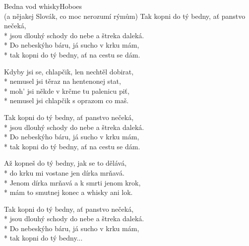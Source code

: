 \documentclass[10.5pt]{book}
\begin{document}
\begin{poem}{Bedna vod whisky}{Hoboes\\(a nějakej Slovák, co moc nerozumí rýmům)}
Tak kopni do tý bedny, ať panstvo nečeká,\\*
jsou dlouhý schody do nebe a štreka daleká.\\*
Do nebeskýho báru, já sucho v krku mám,\\*
tak kopni do tý bedny, ať na cestu se dám.

Kdyby jsi se, chlapčik, len nechtěl dobirat,\\*
nemusel jsi těraz na hentenonej stat,\\*
moh' jsi někde v krčme tu palenicu piť,\\*
nemusel jsi chlapčik s oprazom co maš.

Tak kopni do tý bedny, ať panstvo nečeká,\\*
jsou dlouhý schody do nebe a štreka daleká.\\*
Do nebeskýho báru, já sucho v krku mám,\\*
tak kopni do tý bedny, ať na cestu se dám.

Až kopneš do tý bedny, jak se to dělává,\\*
do krku mi vostane jen dírka mrňavá.\\*
Jenom dírka mrňavá a k smrti jenom krok,\\*
mám to smutnej konec a whisky ani lok.

Tak kopni do tý bedny, ať panstvo nečeká,\\*
jsou dlouhý schody do nebe a štreka daleká.\\*
Do nebeskýho báru, já sucho v krku mám,\\*
tak kopni do tý bedny...

\end{poem}
\end{document}
